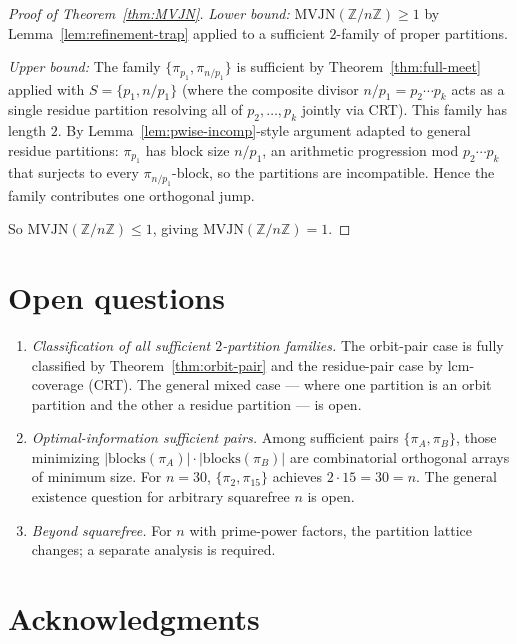 \documentclass[11pt,reqno]{amsart}
\theoremstyle{plain}
\theoremstyle{definition}
\newcommand{\Z}{\mathbb{Z}}
\newcommand{\Zn}{\Z/n\Z}
\newcommand{\lcm}{\mathrm{lcm}}
\newcommand{\MVJN}{\mathrm{MVJN}}
\begin{document}
\begin{proof}[Proof of Theorem~\ref{thm:MVJN}]
\emph{Lower bound:} $\MVJN(\Zn) \geq 1$ by Lemma~\ref{lem:refinement-trap} applied to a sufficient $2$-family of proper partitions.

\emph{Upper bound:} The family $\{\pi_{p_1}, \pi_{n/p_1}\}$ is sufficient by Theorem~\ref{thm:full-meet} applied with $S = \{p_1, n/p_1\}$ (where the composite divisor $n/p_1 = p_2 \cdots p_k$ acts as a single residue partition resolving all of $p_2, \ldots, p_k$ jointly via CRT). This family has length $2$. By Lemma~\ref{lem:pwise-incomp}-style argument adapted to general residue partitions: $\pi_{p_1}$ has block size $n/p_1$, an arithmetic progression mod $p_2 \cdots p_k$ that surjects to every $\pi_{n/p_1}$-block, so the partitions are incompatible. Hence the family contributes one orthogonal jump.

So $\MVJN(\Zn) \leq 1$, giving $\MVJN(\Zn) = 1$.
\end{proof}

\section{Open questions}

\begin{enumerate}[label=\textup{(\alph*)}]
\item \emph{Classification of all sufficient $2$-partition families.} The orbit-pair case is fully classified by Theorem~\ref{thm:orbit-pair} and the residue-pair case by $\lcm$-coverage (CRT). The general mixed case --- where one partition is an orbit partition and the other a residue partition --- is open.
\item \emph{Optimal-information sufficient pairs.} Among sufficient pairs $\{\pi_A, \pi_B\}$, those minimizing $|\mathrm{blocks}(\pi_A)| \cdot |\mathrm{blocks}(\pi_B)|$ are combinatorial orthogonal arrays of minimum size. For $n = 30$, $\{\pi_2, \pi_{15}\}$ achieves $2 \cdot 15 = 30 = n$. The general existence question for arbitrary squarefree $n$ is open.
\item \emph{Beyond squarefree.} For $n$ with prime-power factors, the partition lattice changes; a separate analysis is required.
\end{enumerate}

\section*{Acknowledgments}
\end{document}
